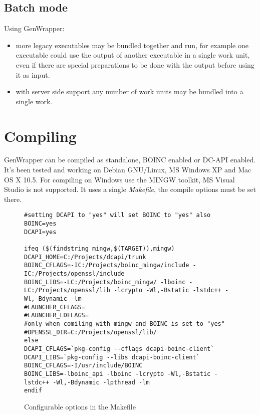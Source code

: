 \documentclass[a4paper,12pt,titlepage,dvipdfm]{article}
\begin{document}
\subsection{Batch mode}

Using GenWrapper:
\begin{itemize}
    \item more legacy executables may be bundled together and run, for example one executable could use the output of another executable in a single work unit, even if there are special preparations to be done with the output before using it as input.
    \item with server side support any number of work units may be bundled into a single work.
\end{itemize}

\pagebreak 


\section{Compiling}

GenWrapper can be compiled as standalone, BOINC enabled or DC-API enabled. It's been tested and working on Debian GNU/Linux, MS Windows XP and Mac OS X 10.5. For compiling on Windows use the MINGW toolkit, MS Visual Studio is not supported. It uses a single \emph{Makefile}, the compile options must be set there. 

\lstset{
  breaklines=true,                                     %
  language=make,
  frame=trbl,
  framesep=5pt,
  basicstyle=\small,
  keywordstyle=\ttfamily,
  identifierstyle=\texttt,
  stringstyle=\ttfamily,
  linewidth=\textwidth,
  numbers=none
}

\begin{figure}[htb]
\begin{lstlisting}[breaklines=true]
#setting DCAPI to "yes" will set BOINC to "yes" also
BOINC=yes
DCAPI=yes

ifeq ($(findstring mingw,$(TARGET)),mingw)
DCAPI_HOME=C:/Projects/dcapi/trunk
BOINC_CFLAGS=-IC:/Projects/boinc_mingw/include -IC:/Projects/openssl/include
BOINC_LIBS=-LC:/Projects/boinc_mingw/ -lboinc -LC:/Projects/openssl/lib -lcrypto -Wl,-Bstatic -lstdc++ -Wl,-Bdynamic -lm
#LAUNCHER_CFLAGS=
#LAUNCHER_LDFLAGS=
#only when comiling with mingw and BOINC is set to "yes"
#OPENSSL_DIR=C:/Projects/openssl/lib/
else
DCAPI_CFLAGS=`pkg-config --cflags dcapi-boinc-client`
DCAPI_LIBS=`pkg-config --libs dcapi-boinc-client`
BOINC_CFLAGS=-I/usr/include/BOINC
BOINC_LIBS=-lboinc_api -lboinc -lcrypto -Wl,-Bstatic -lstdc++ -Wl,-Bdynamic -lpthread -lm
endif

\end{lstlisting}
\caption{Configurable options in the Makefile}\label{fig:makefile}
\end{figure}
\end{document}
